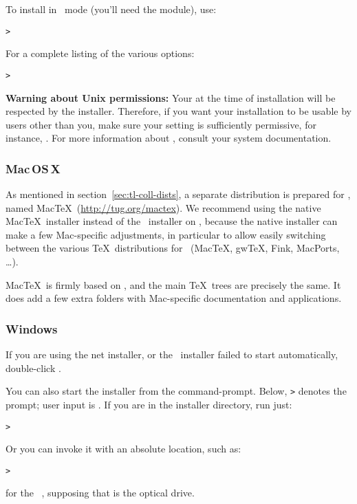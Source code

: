 \documentclass{article}
\begin{document}
To install in \GUI\ mode (you'll need the  module), use:
\begin{alltt}
> 
\end{alltt}

For a complete listing of the various options:
\begin{alltt}
> 
\end{alltt}

\textbf{Warning about Unix permissions:} Your  at the time
of installation will be respected by the \TL{} installer.  Therefore, if
you want your installation to be usable by users other than you, make
sure your setting is sufficiently permissive, for instance, .  For more information about , consult your system
documentation.


\subsubsection{Mac\,OS\,X}

As mentioned in section~\ref{sec:tl-coll-dists}, a separate distribution
is prepared for \MacOSX, named Mac\TeX\ (\url{http://tug.org/mactex}).
We recommend using the native Mac\TeX\ installer instead of the \TL\
installer on \MacOSX, because the native installer can make a few
Mac-specific adjustments, in particular to allow easily switching
between the various \TeX\ distributions for \MacOSX\ (Mac\TeX, gw\TeX,
Fink, MacPorts, \ldots).

Mac\TeX\ is firmly based on \TL, and the main \TeX\ trees are precisely
the same.  It does add a few extra folders with Mac-specific
documentation and applications.


\subsubsection{Windows}

If you are using the net installer, or the \DVD\ installer failed to
start automatically, double-click \filename{install-tl.bat}.

You can also start the installer from the command-prompt.  Below,
\texttt{>} denotes the prompt; user input is \Ucom{\texttt{bold}}.  If
you are in the installer directory, run just:
\begin{alltt}
> 
\end{alltt}

Or you can invoke it with an absolute location, such as:
\begin{alltt}
> 
\end{alltt}
for the \TK\ \DVD, supposing that  is the optical drive.
\end{document}
